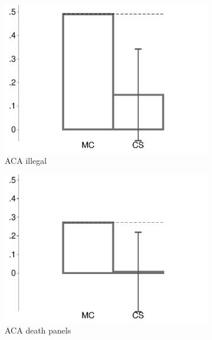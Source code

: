 \begin{figure}[t]
\begin{subfigure}{.325\textwidth}
		\includegraphics[width=\textwidth]{../figs/confidence_score_ccd_ida_ips_illegal_study1.pdf}
		\caption{ACA illegal}
	\end{subfigure}	
	\begin{subfigure}{.325\textwidth}\centering
		\includegraphics[width=\textwidth]{../figs/confidence_score_ccd_ida_ips_death_study1.pdf}
		\caption{ACA death panels}
	\end{subfigure}
	\hfill
	\begin{subfigure}{.325\textwidth}\centering

\end{subfigure}
\end{figure}
